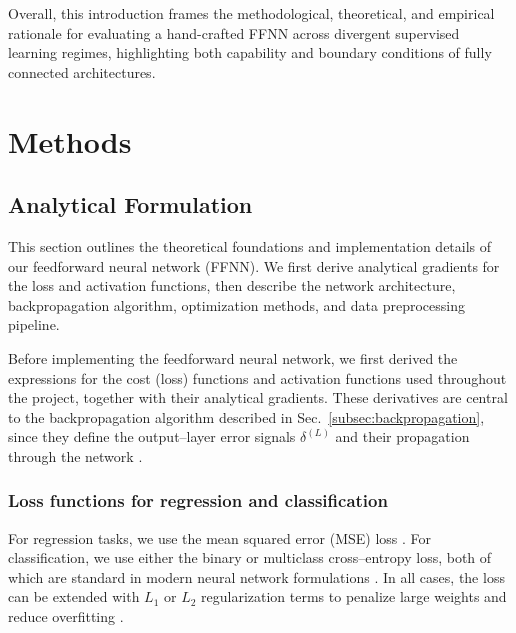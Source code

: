 \documentclass[amssymb,twocolumn,aps]{revtex4}
\begin{document}
Overall, this introduction frames the methodological, theoretical, and empirical rationale for evaluating a hand-crafted FFNN across divergent supervised learning regimes, highlighting both capability and boundary conditions of fully connected architectures.

    
\section{Methods}\label{section:methods}

\subsection{Analytical Formulation}
\label{subsec:analytical}

This section outlines the theoretical foundations and implementation details of our feedforward neural network (FFNN). We first derive analytical gradients for the loss and activation functions, then describe the network architecture, backpropagation algorithm, optimization methods, and data preprocessing pipeline.

Before implementing the feedforward neural network, we first derived the expressions for the cost (loss) functions and activation functions used throughout the project, together with their analytical gradients. These derivatives are central to the backpropagation algorithm described in
Sec.~\ref{subsec:backpropagation}, since they define the output--layer error
signals $\delta^{(L)}$ and their propagation through the network
\cite{deisenroth2020,goodfellow2016}.

\subsubsection{Loss functions for regression and classification}
For regression tasks, we use the mean squared error (MSE) loss
\cite{hastie2025,deisenroth2020}. For classification, we use either the
binary or multiclass cross--entropy loss, both of which are standard in modern
neural network formulations \cite{goodfellow2016,compfys}. In all cases, the loss
can be extended with $L_1$ or $L_2$ regularization terms to penalize large
weights and reduce overfitting \cite{hastie2025}.
\end{document}

